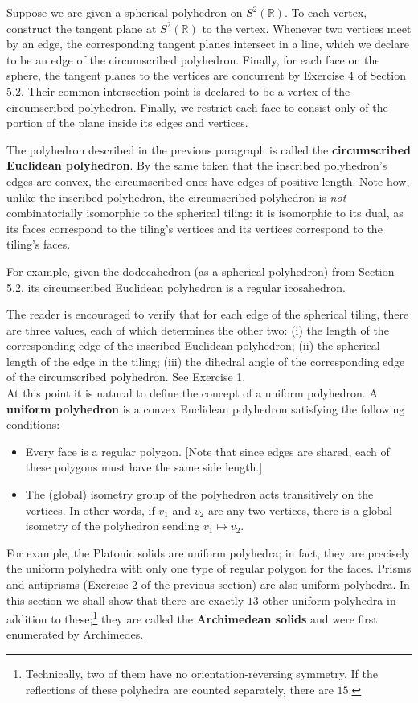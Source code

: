 \documentclass[leqno]{book}
\begin{document}
Suppose we are given a spherical polyhedron on $S^2(\mathbb R)$.  To each vertex, construct the tangent plane at $S^2(\mathbb R)$ to the vertex.  Whenever two vertices meet by an edge, the corresponding tangent planes intersect in a line, which we declare to be an edge of the circumscribed polyhedron.  Finally, for each face on the sphere, the tangent planes to the vertices are concurrent by Exercise 4 of Section 5.2.  Their common intersection point is declared to be a vertex of the circumscribed polyhedron.  Finally, we restrict each face to consist only of the portion of the plane inside its edges and vertices.

The polyhedron described in the previous paragraph is called the \textbf{circumscribed Euclidean polyhedron}.  By the same token that the inscribed polyhedron's edges are convex, the circumscribed ones have edges of positive length.  Note how, unlike the inscribed polyhedron, the circumscribed polyhedron is \emph{not} combinatorially isomorphic to the spherical tiling: it is isomorphic to its dual, as its faces correspond to the tiling's vertices and its vertices correspond to the tiling's faces.

For example, given the dodecahedron (as a spherical polyhedron) from Section 5.2, its circumscribed Euclidean polyhedron is a regular icosahedron.

The reader is encouraged to verify that for each edge of the spherical tiling, there are three values, each of which determines the other two: (i) the length of the corresponding edge of the inscribed Euclidean polyhedron; (ii) the spherical length of the edge in the tiling; (iii) the dihedral angle of the corresponding edge of the circumscribed polyhedron.  See Exercise 1.\\

\noindent At this point it is natural to define the concept of a uniform polyhedron.  A \textbf{uniform polyhedron} is a convex Euclidean polyhedron satisfying the following conditions:
\begin{itemize}
\item Every face is a regular polygon.  [Note that since edges are shared, each of these polygons must have the same side length.]

\item The (global) isometry group of the polyhedron acts transitively on the vertices.  In other words, if $v_1$ and $v_2$ are any two vertices, there is a global isometry of the polyhedron sending $v_1\mapsto v_2$.
\end{itemize}
For example, the Platonic solids are uniform polyhedra; in fact, they are precisely the uniform polyhedra with only one type of regular polygon for the faces.  Prisms and antiprisms (Exercise 2 of the previous section) are also uniform polyhedra.  In this section we shall show that there are exactly $13$ other uniform polyhedra in addition to these;\footnote{Technically, two of them have no orientation-reversing symmetry.  If the reflections of these polyhedra are counted separately, there are $15$.} they are called the \textbf{Archimedean solids} and were first enumerated by Archimedes. %
\end{document}
